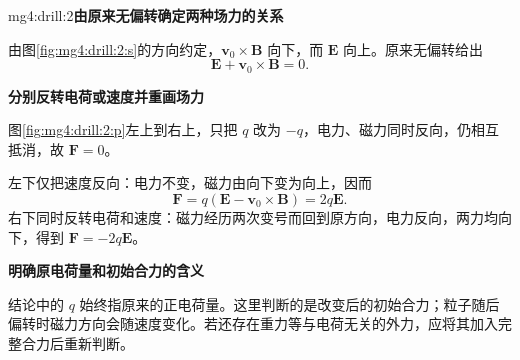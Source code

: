 \begin{drillsolution}{mg4:drill:2}\textbf{由原来无偏转确定两种场力的关系}\par\nobreak
由图\ref{fig:mg4:drill:2:s}的方向约定，$\bm v_0\times\bm B$ 向下，而 $\bm E$ 向上。原来无偏转给出
\[
\bm E+\bm v_0\times\bm B=0.
\]


\par\medskip{}\noindent\textbf{分别反转电荷或速度并重画场力}\par\nobreak
图\ref{fig:mg4:drill:2:p}左上到右上，只把 $q$ 改为 $-q$，电力、磁力同时反向，仍相互抵消，故 $\bm F=0$。

左下仅把速度反向：电力不变，磁力由向下变为向上，因而
\[
\bm F=q(\bm E-\bm v_0\times\bm B)=\boxed{2q\bm E}.
\]
右下同时反转电荷和速度：磁力经历两次变号而回到原方向，电力反向，两力均向下，得到 $\boxed{\bm F=-2q\bm E}$。



\par\medskip{}\noindent\textbf{明确原电荷量和初始合力的含义}\par\nobreak
结论中的 $q$ 始终指原来的正电荷量。这里判断的是改变后的初始合力；粒子随后偏转时磁力方向会随速度变化。若还存在重力等与电荷无关的外力，应将其加入完整合力后重新判断。\end{drillsolution}

